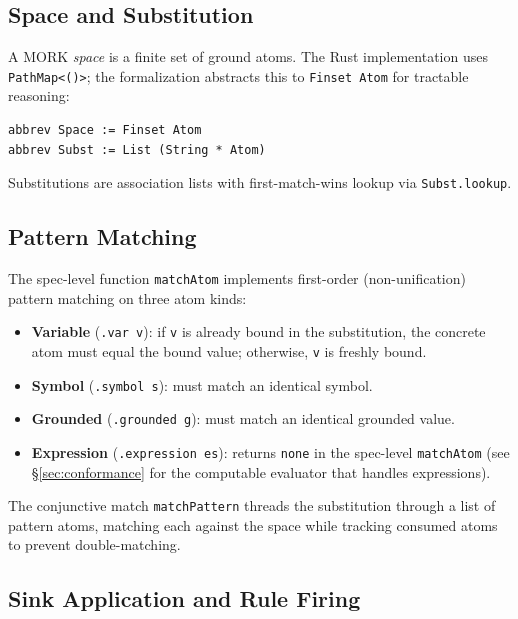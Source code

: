 \documentclass[11pt]{article}
\theoremstyle{definition}
\theoremstyle{remark}
\newcommand{\MORK}{\textup{MORK}}
\begin{document}
\subsection{Space and Substitution}

A \MORK{} \emph{space} is a finite set of ground atoms.
The Rust implementation uses \texttt{PathMap<()>}; the formalization abstracts
this to \texttt{Finset Atom} for tractable reasoning:

\begin{lstlisting}[caption={Space and substitution (\texttt{Space.lean}).}]
abbrev Space := Finset Atom
abbrev Subst := List (String * Atom)
\end{lstlisting}

Substitutions are association lists with first-match-wins lookup via
\texttt{Subst.lookup}.

\subsection{Pattern Matching}

The spec-level function \texttt{matchAtom} implements first-order
(non-unification) pattern matching on three atom kinds:

\begin{itemize}[nosep]
  \item \textbf{Variable} (\texttt{.var v}): if \texttt{v} is already bound
    in the substitution, the concrete atom must equal the bound value;
    otherwise, \texttt{v} is freshly bound.
  \item \textbf{Symbol} (\texttt{.symbol s}): must match an identical symbol.
  \item \textbf{Grounded} (\texttt{.grounded g}): must match an identical
    grounded value.
  \item \textbf{Expression} (\texttt{.expression es}): returns \texttt{none}
    in the spec-level \texttt{matchAtom} (see \S\ref{sec:conformance} for
    the computable evaluator that handles expressions).
\end{itemize}

\noindent
The conjunctive match \texttt{matchPattern} threads the substitution through
a list of pattern atoms, matching each against the space while tracking
consumed atoms to prevent double-matching.

\subsection{Sink Application and Rule Firing}
\end{document}
